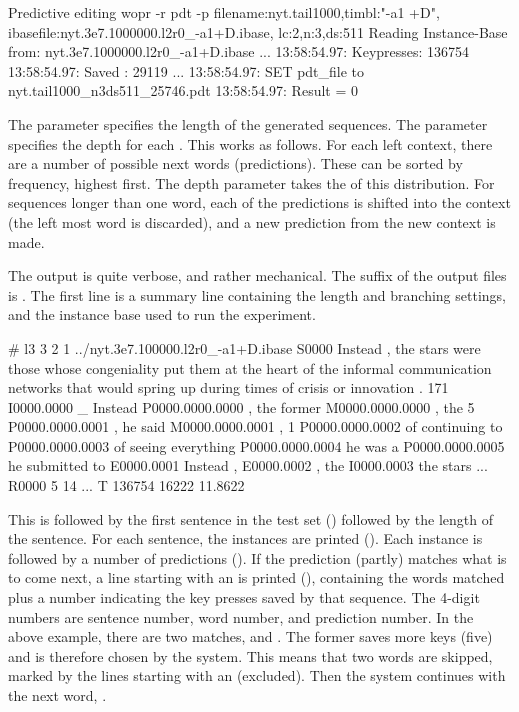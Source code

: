 \documentclass[a4paper,10pt,twoside]{report}
\begin{document}
\begin{bash}{Predictive editing}
wopr -r pdt -p filename:nyt.tail1000,timbl:"-a1 +D",
               ibasefile:nyt.3e7.1000000.l2r0_-a1+D.ibase,
               lc:2,n:3,ds:511
Reading Instance-Base from: nyt.3e7.1000000.l2r0_-a1+D.ibase
...
13:58:54.97: Keypresses: 136754
13:58:54.97: Saved     : 29119
...
13:58:54.97: SET pdt_file to nyt.tail1000_n3ds511_25746.pdt
13:58:54.97: Result = 0
\end{bash}

The  parameter specifies the length of the generated sequences. The
 parameter specifies the depth for each . This works as
follows. For each left context, there are a number of possible next words
(predictions). These can be sorted by frequency, highest first. The depth
parameter takes the  of this distribution. For sequences longer than one
word, each of the predictions is shifted into the context (the left most word is
discarded), and a new prediction from the new context is made.

The output is quite verbose, and rather mechanical. The suffix of the output
files is . The first line is a summary line containing the length and
branching settings, and the instance base used to run the experiment.

\begin{wout}{}
# l3 3 2 1 ../nyt.3e7.100000.l2r0_-a1+D.ibase
S0000 Instead , the stars were those whose congeniality put them at the
heart of the informal communication networks that would spring up during
times of crisis or innovation .  171
I0000.0000 _ Instead
P0000.0000.0000 , the former
M0000.0000.0000 , the 5
P0000.0000.0001 , he said
M0000.0000.0001 , 1
P0000.0000.0002 of continuing to
P0000.0000.0003 of seeing everything
P0000.0000.0004 he was a
P0000.0000.0005 he submitted to
E0000.0001 Instead ,
E0000.0002 , the
I0000.0003 the stars
...
R0000 5 14
...
T 136754 16222 11.8622
\end{wout}

This is followed by the first sentence in the test set () followed by
the length of the sentence. For each sentence, the instances are printed
(). Each instance is followed by a number of predictions
(). If the prediction (partly) matches what is to come
next, a line starting with an  is printed (),
containing the words matched plus a number indicating the key presses saved by
that sequence. The 4-digit numbers are sentence number, word number, and
prediction number. In the above example, there are two matches,
 and . The former saves more keys
(five) and is therefore chosen by the system. This means that two words are
skipped, marked by the lines starting with an  (excluded). Then the
system continues with the next word, .
\end{document}
